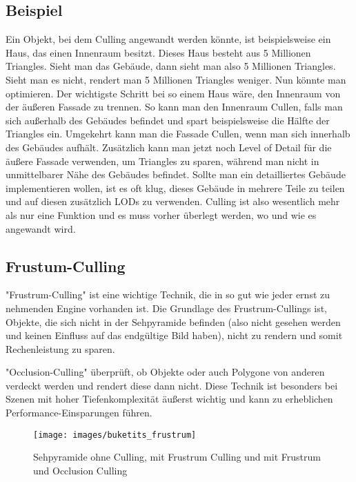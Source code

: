 \subsection{Beispiel}
Ein Objekt, bei dem Culling angewandt werden könnte, ist beispielsweise ein Haus, das einen Innenraum besitzt. Dieses Haus besteht aus 5 Millionen Triangles. Sieht man das Gebäude, dann sieht man also 5 Millionen Triangles. Sieht man es nicht, rendert man 5 Millionen Triangles weniger. Nun könnte man optimieren.\cite{_cryengine_culling}
Der wichtigste Schritt bei so einem Haus wäre, den Innenraum von der äußeren Fassade zu trennen. So kann man den Innenraum Cullen, falls man sich außerhalb des Gebäudes befindet und spart beispielsweise die Hälfte der Triangles ein. Umgekehrt kann man die Fassade Cullen, wenn man sich innerhalb des Gebäudes aufhält.\cite{_cryengine_culling}
Zusätzlich kann man jetzt noch Level of Detail für die äußere Fassade verwenden, um Triangles zu sparen, während man nicht in unmittelbarer Nähe des Gebäudes befindet. Sollte man ein detailliertes Gebäude implementieren wollen, ist es oft klug, dieses Gebäude in mehrere Teile zu teilen und auf diesen zusätzlich LODs zu verwenden. Culling ist also wesentlich mehr als nur eine Funktion und es muss vorher überlegt werden, wo und wie es angewandt wird.
\cite{_cryengine_culling}

\subsection{Frustum-Culling}
"Frustrum-Culling" ist eine wichtige Technik, die in so gut wie jeder ernst zu nehmenden Engine vorhanden ist. Die Grundlage des Frustrum-Cullings ist, Objekte, die sich nicht in der Sehpyramide befinden (also nicht gesehen werden und keinen Einfluss auf das endgültige Bild haben), nicht zu rendern und somit Rechenleistung zu sparen.
\cite{_cryengine_culling}

"Occlusion-Culling" überprüft, ob Objekte oder auch Polygone von anderen verdeckt werden und rendert diese dann nicht. Diese Technik ist besonders bei Szenen mit hoher Tiefenkomplexität äußerst wichtig und kann zu erheblichen Performance-Einsparungen führen.
\cite{_cryengine_culling}

\begin{figure}[H]
	\centering
	\texttt{[image: images/buketits\_frustrum]}
	\caption{Sehpyramide ohne Culling, mit Frustrum Culling und mit Frustrum und Occlusion Culling\cite{_culling}}
\end{figure}

